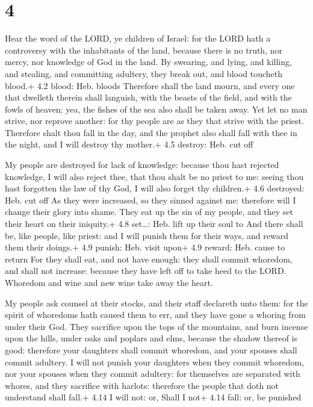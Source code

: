 \hypertarget{section-3}{%
\section{4}\label{section-3}}

 Hear the word of the LORD, ye children of Israel: for the
LORD hath a controversy with the inhabitants of the land, because there
is no truth, nor mercy, nor knowledge of God in the land. 
By swearing, and lying, and killing, and stealing, and committing
adultery, they break out, and blood toucheth blood.+ 4.2 blood: Heb.
bloods  Therefore shall the land mourn, and every one that
dwelleth therein shall languish, with the beasts of the field, and with
the fowls of heaven; yea, the fishes of the sea also shall be taken
away.  Yet let no man strive, nor reprove another: for thy
people are as they that strive with the priest.  Therefore
shalt thou fall in the day, and the prophet also shall fall with thee in
the night, and I will destroy thy mother.+ 4.5 destroy: Heb. cut off

 My people are destroyed for lack of knowledge: because
thou hast rejected knowledge, I will also reject thee, that thou shalt
be no priest to me: seeing thou hast forgotten the law of thy God, I
will also forget thy children.+ 4.6 destroyed: Heb. cut off 
As they were increased, so they sinned against me: therefore will I
change their glory into shame.  They eat up the sin of my
people, and they set their heart on their iniquity.+ 4.8 set\ldots: Heb.
lift up their soul to  And there shall be, like people, like
priest: and I will punish them for their ways, and reward them their
doings.+ 4.9 punish: Heb. visit upon+ 4.9 reward: Heb. cause to return
 For they shall eat, and not have enough: they shall commit
whoredom, and shall not increase: because they have left off to take
heed to the LORD.  Whoredom and wine and new wine take away
the heart.

 My people ask counsel at their stocks, and their staff
declareth unto them: for the spirit of whoredoms hath caused them to
err, and they have gone a whoring from under their God. 
They sacrifice upon the tops of the mountains, and burn incense upon the
hills, under oaks and poplars and elms, because the shadow thereof is
good: therefore your daughters shall commit whoredom, and your spouses
shall commit adultery.  I will not punish your daughters
when they commit whoredom, nor your spouses when they commit adultery:
for themselves are separated with whores, and they sacrifice with
harlots: therefore the people that doth not understand shall fall.+ 4.14
I will not: or, Shall I not+ 4.14 fall: or, be punished

